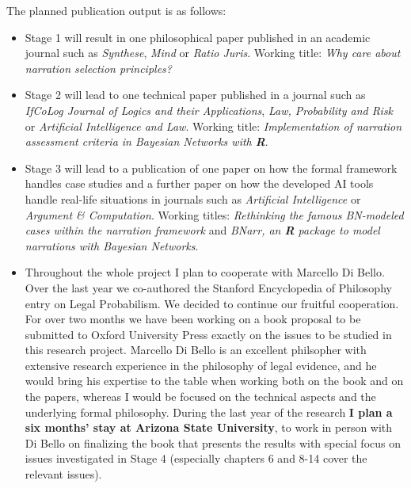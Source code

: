 \documentclass[11pt,dvipsnames,enabledeprecatedfontcommands]{scrartcl}
\begin{document}
\vspace{2mm}

The planned publication output is as follows:

\begin{itemize}\setlength\itemsep{1mm}
\item \textsf{Stage 1} will result in  one philosophical paper published in an  academic journal such as \emph{Synthese}, \emph{Mind} or \emph{Ratio Juris}. Working title: \emph{Why care about narration selection principles?}

\item \textsf{Stage 2} will lead to one   technical paper  published in a journal such as \emph{IfCoLog Journal of Logics and their Applications}, \emph{Law, Probability and Risk} or \emph{Artificial Intelligence and Law}. Working title: \emph{Implementation of narration assessment criteria in Bayesian Networks with \textbf{\textsf{R}}}.

\item \textsf{Stage 3}  will lead to a publication of one paper  on  how the formal framework handles case studies and  a further paper  on how the developed AI tools handle real-life situations in   journals such as \emph{Artificial Intelligence} or \emph{Argument \& Computation}. Working titles: \emph{Rethinking the famous BN-modeled cases within the narration framework} and \emph{BNarr, an \textbf{\textsf{R}} package to model narrations with Bayesian Networks}.

\item Throughout the  whole project I plan to cooperate with Marcello Di Bello. Over the last year we co-authored the Stanford Encyclopedia of Philosophy entry on Legal Probabilism. We decided to continue our fruitful cooperation. For over two months we have been working on a book proposal to be submitted to Oxford University Press exactly on the issues to be studied in this research project. Marcello Di Bello is an excellent philsopher with extensive research experience in the philosophy of legal evidence, and he would bring his expertise to the table when working both on the book and on the papers, whereas I would be focused on the technical aspects and the underlying  formal philosophy. During the last year of the research \textbf{I plan a six months' stay at Arizona State University}, to work in person with Di Bello on finalizing the book that presents the results with special focus on issues investigated in \textsf{Stage 4} (especially chapters 6 and 8-14 cover the relevant issues).
\end{itemize}
\end{document}
